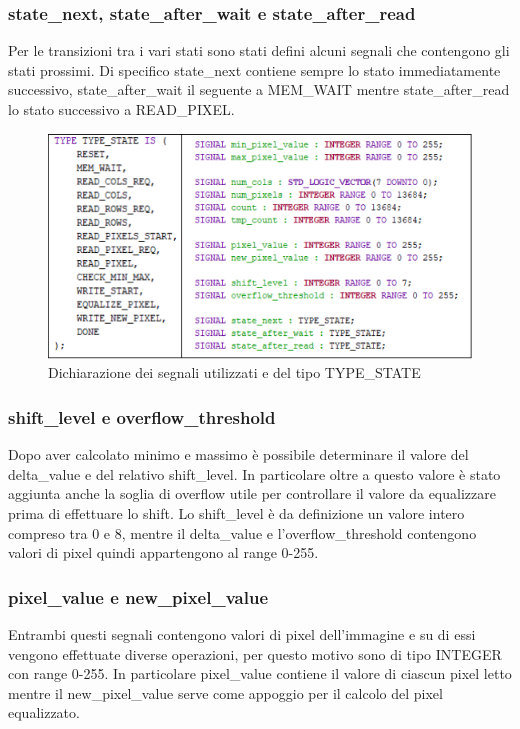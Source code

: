 \documentclass{article}
\begin{document}
\subsubsection{state\_next, state\_after\_wait e state\_after\_read}
Per le transizioni tra i vari stati sono stati defini alcuni segnali che contengono gli stati prossimi. Di specifico state\_next contiene sempre lo stato immediatamente successivo, state\_after\_wait il seguente a MEM\_WAIT mentre state\_after\_read lo stato successivo a READ\_PIXEL.

\begin{figure}[h]
    \vspace{1cm}
    \includegraphics[width=\textwidth]{signals-definition.png}
    \centering
    \caption{Dichiarazione dei segnali utilizzati e del tipo TYPE\_STATE}
\end{figure}

\pagebreak

\subsubsection{shift\_level e overflow\_threshold}
Dopo aver calcolato minimo e massimo è possibile determinare il valore del delta\_value e del relativo shift\_level. In particolare oltre a questo valore è stato aggiunta anche la soglia di overflow utile per controllare il valore da equalizzare prima di effettuare lo shift. Lo shift\_level è da definizione un valore intero compreso tra 0 e 8, mentre il delta\_value e l'overflow\_threshold contengono valori di pixel quindi appartengono al range 0-255.


\subsubsection{pixel\_value e new\_pixel\_value}
Entrambi questi segnali contengono valori di pixel dell'immagine e su di essi vengono effettuate diverse operazioni, per questo motivo sono di tipo INTEGER con range 0-255. In particolare pixel\_value contiene il valore di ciascun pixel letto mentre il new\_pixel\_value serve come appoggio per il calcolo del pixel equalizzato.
\end{document}
